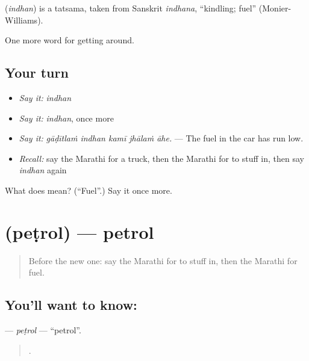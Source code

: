 \begin{cousinweb}
\textbf{} (\emph{indhan}) is a tatsama, taken from Sanskrit \emph{indhana}, \textquotedblleft{}kindling; fuel\textquotedblright{} (Monier-Williams).
\end{cousinweb}

\begin{grammarlens}[title={What you've built}]
One more word for getting around.
\end{grammarlens}

\subsection*{Your turn}
\begin{itemize}
\raggedright
  \item \emph{Say it:} \emph{indhan}
  \item \emph{Say it:} \emph{indhan}, once more
  \item \emph{Say it:} \emph{gāḍītlaṁ indhan kamī jhālaṁ āhe.} — The fuel in the car has run low.
  \item \emph{Recall:} say the Marathi for a truck, then the Marathi for to stuff in, then say \emph{indhan} again
\end{itemize}

\begin{tcolorbox}[breakable,colback=teal!4,colframe=teal!35!black,title={Before you move on}]
What does  mean? (\textquotedblleft{}Fuel\textquotedblright{}.) Say it once more.
\end{tcolorbox}
\section[\texorpdfstring{\mr{पेट्रोल} (peṭrol)}{पेट्रोल (peṭrol)}]{ (peṭrol) — petrol}

\label{lesson:MR-C401-petrol}



\begin{quote}
Before the new one: say the Marathi for to stuff in, then the Marathi for fuel.
\end{quote}

\subsection*{You'll want to know: }
\textbf{} — \emph{peṭrol} — \textquotedblleft{}petrol\textquotedblright{}.

\begin{quote}
   .
\end{quote}

